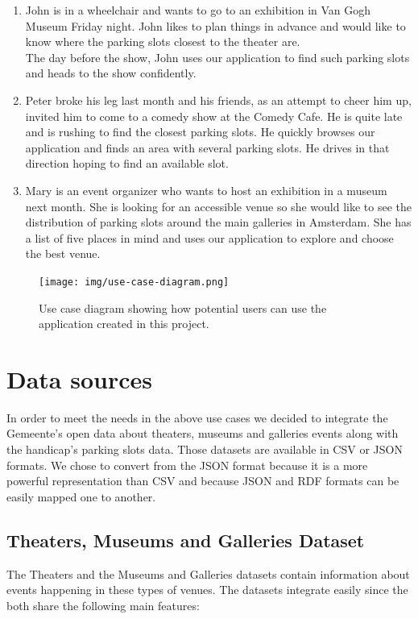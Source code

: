 \documentclass[runningheads,a4paper]{../../StyleFiles/llncs}
\begin{document}
\begin{enumerate}
	\item John is in a wheelchair and wants to go to an exhibition in Van Gogh Museum Friday night. John likes to plan things in advance and would like to know where the parking slots closest to the theater are. \\
	The day before the show, John uses our application to find such parking slots and heads to the show confidently. 
	\item Peter broke his leg last month and his friends, as an attempt to cheer him up, invited him to come to a comedy show at the Comedy Cafe. He is quite late and is rushing to find the closest parking slots. He quickly browses our application and finds an area with several parking slots. He drives in that direction hoping to find an available slot. 
	\item Mary is an event organizer who wants to host an exhibition in a museum next month. She is looking for an accessible venue so she would like to see the distribution of parking slots around the main galleries in Amsterdam. She has a list of five places in mind and uses our application to explore and choose the best venue.
\end{enumerate}

\begin{figure}[ht]
	\centering
	\texttt{[image: img/use-case-diagram.png]}
	\caption{Use case diagram showing how potential users can use the application created in this project.}
	\label{fig:use-case}
\end{figure}

\section{Data sources}
In order to meet the needs in the above use cases we decided to integrate the Gemeente's open data about theaters, museums and galleries events along with the handicap's parking slots data. Those datasets are available in CSV or JSON formats. We chose to convert from the JSON format because it is a more powerful representation than CSV and because JSON and RDF formats can be easily mapped one to another.

\subsection{Theaters, Museums and Galleries Dataset}
The Theaters and the Museums and Galleries datasets contain information about events happening in these types of venues. The datasets integrate easily since the both share the following main features:
\end{document}
